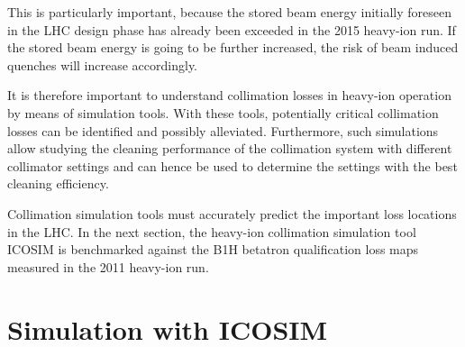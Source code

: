 This is particularly important, because the stored beam energy initially foreseen in the LHC design phase has already been exceeded in the 2015 heavy-ion run. If the stored beam energy is going to be further increased, the risk of beam induced quenches will increase accordingly. 

It is therefore important to understand collimation losses in  heavy-ion operation by means of simulation tools. With these tools, potentially critical collimation losses can be identified and possibly alleviated. Furthermore, such simulations allow studying the cleaning performance of the collimation system with different collimator settings and can hence be used to determine the settings with the best cleaning efficiency. 

Collimation simulation tools must accurately predict the important loss locations in the LHC. In the next section, the heavy-ion collimation simulation tool ICOSIM is benchmarked against the B1H betatron qualification loss maps measured in the 2011 heavy-ion run.


\section{Simulation with ICOSIM} \label{firstICOS}


